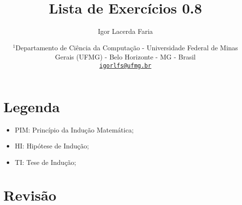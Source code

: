 \documentclass{article}
\author{Igor Lacerda Faria}
\begin{document}
\title{\textbf{Lista de Exercícios 0.8}}

\date{%
\( ^1 \)Departamento de Ciência da Computação - Universidade Federal de Minas Gerais (UFMG) - Belo Horizonte - MG - Brasil \\ [3ex]
\href{mailto:igorlfs@ufmg.br}{\nolinkurl{igorlfs@ufmg.br}}
}

\maketitle

\section*{Legenda}

\begin{itemize}
	\item PIM: Princípio da Indução Matemática;
	\item HI: Hipótese de Indução;
	\item TI: Tese de Indução;
\end{itemize}

\section*{Revisão}
\end{document}
